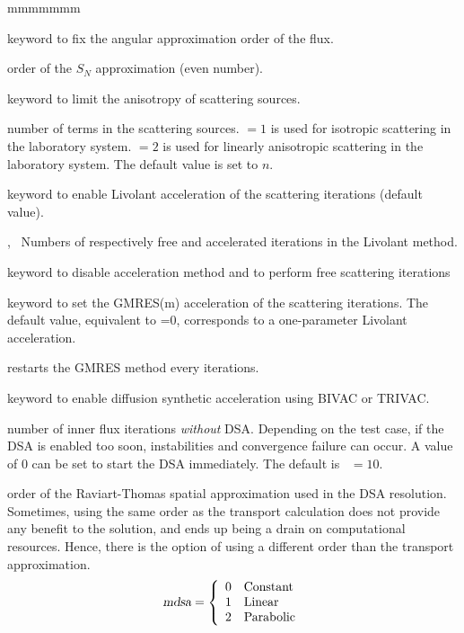 \begin{ListeDeDescription}{mmmmmmm}
\item[\moc{SN}] keyword to fix the angular approximation order of the flux.

\item[\dusa{n}] order of the $S_N$ approximation (even number).

\item[\moc{SCAT}] keyword to limit the anisotropy of scattering sources.

\item[\dusa{iscat}] number of terms in the scattering sources.  $=1$ is used for
isotropic scattering in the laboratory system.  $=2$ is used for
linearly anisotropic scattering in the laboratory system. The default value is set to $n$.

\item[\moc{LIVO}] keyword to enable Livolant acceleration of the scattering iterations (default value).
\item[\dusa{icl1},~\dusa{icl2}] Numbers of respectively free and accelerated iterations in the Livolant method.
\item[\moc{NLIVO}] keyword to disable acceleration method and to perform free scattering iterations

\item[\moc{GMRES}] keyword to set the GMRES(m) acceleration of the scattering iterations. The default value,
equivalent to =0, corresponds to a one-parameter Livolant acceleration.\cite{gmres}

\item[\dusa{nstart}] restarts the GMRES method every  iterations.

\item[\moc{DSA}] keyword to enable diffusion synthetic acceleration using BIVAC or TRIVAC.
\item[\dusa{ndsa}] number of inner flux iterations {\sl without} DSA. Depending on the test case, if the DSA is enabled too soon, instabilities and convergence failure can occur. A value of $0$ can be set to start the DSA immediately. The default is ~$=10$. %
\item[\dusa{mdsa}] order of the Raviart-Thomas spatial approximation used in the DSA resolution. Sometimes, using the same order as the transport calculation does not provide any benefit to the solution, and ends up being a drain on computational resources. Hence, there is the option of using a different order than the transport approximation.
\begin{displaymath}
\dusa{mdsa} = \left\{
\begin{array}{rl}
 0 & \textrm{Constant} \\
 1 & \textrm{Linear} \\
 2 & \textrm{Parabolic} \\
\end{array} \right.
\end{displaymath}


\end{ListeDeDescription}
